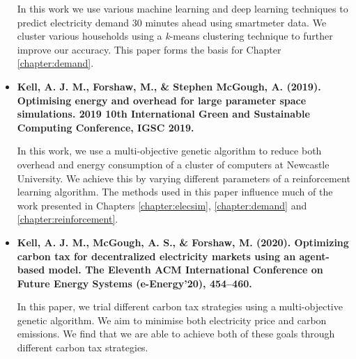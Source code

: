 \begin{itemize}
	In this work we use various machine learning and deep learning techniques to predict electricity demand 30 minutes ahead using \gls{smartmeter} data. We cluster various households using a \textit{k}-means clustering technique to further improve our accuracy. This paper forms the basis for Chapter \ref{chapter:demand}.
	
	\item[\textbf{\cite{Kell2019}}] \textbf{Kell, A. J. M., Forshaw, M., \& Stephen McGough, A. (2019). Optimising energy and overhead for large parameter space simulations. 2019 10th International Green and Sustainable Computing Conference, IGSC 2019. }

	In this work, we use a multi-objective genetic algorithm to reduce both overhead and energy consumption of a cluster of computers at Newcastle University. We achieve this by varying different parameters of a reinforcement learning algorithm. The methods used in this paper influence much of the work presented in Chapters \ref{chapter:elecsim}, \ref{chapter:demand} and \ref{chapter:reinforcement}.

	\item[\textbf{\cite{Kell2020a}}] \textbf{Kell, A. J. M., McGough, A. S., \& Forshaw, M. (2020). Optimizing carbon tax for decentralized electricity markets using an agent-based model. The Eleventh ACM International Conference on Future Energy Systems (e-Energy’20), 454–460.}
	
	In this paper, we trial different carbon tax strategies using a multi-objective genetic algorithm. We aim to minimise both electricity price and carbon emissions. We find that we are able to achieve both of these goals through different carbon tax strategies.
	
\end{itemize}

	

